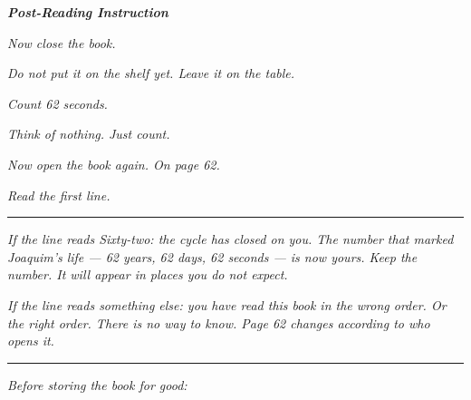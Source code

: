 \documentclass[14pt,openany]{extbook}
\begin{document}
\vfill
\clearpage

\thispagestyle{empty}
\null
\vfill
\begin{center}

\vspace*{\fill}

\noindent\textit{\textcolor{sangue}{\textbf{Post-Reading Instruction}}}

\vspace{1.5em}

\noindent\textit{Now close the book.}

\noindent\textit{Do not put it on the shelf yet. Leave it on the table.}

\vspace{0.8em}

\noindent\textit{Count 62 seconds.}

\noindent\textit{Think of nothing. Just count.}

\vspace{0.8em}

\noindent\textit{Now open the book again. On page 62.}

\noindent\textit{Read the first line.}

\vspace{1em}

\noindent\textcolor{sangue}{\rule{0.15\textwidth}{0.5pt}}

\vspace{1em}

\noindent\textit{If the line reads \textquotedbl{}Sixty-two\textquotedbl{}: the cycle has closed on you. The number that marked Joaquim's life --- 62 years, 62 days, 62 seconds --- is now yours. Keep the number. It will appear in places you do not expect.}

\noindent\textit{If the line reads something else: you have read this book in the wrong order. Or the right order. There is no way to know. Page 62 changes according to who opens it.}

\vspace{1.5em}

\noindent\textcolor{sangue}{\rule{0.15\textwidth}{0.5pt}}

\vspace{1.5em}

\noindent\textit{Before storing the book for good:}


\end{center}
\end{document}
